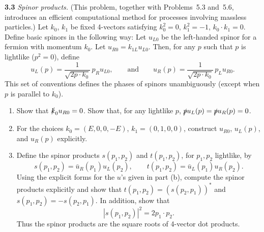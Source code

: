 \textbf{3.3} \emph{Spinor products.}  (This problem, together with
Problems~5.3 and~5.6, introduces an efficient computational method for
processes involving massless particles.)  Let $k_0$, $k_1$ be fixed 4-vectors
satisfying $k_0^2 = 0$, $k_1^2 = -1$, $k_0\cdot k_1 = 0$.  Define basic
spinors in the following way: Let $u_{L0}$ be the left-handed spinor for a
fermion with momentum $k_0$.  Let $u_{R0} = k_{1L}u_{L0}$.  Then, for any
$p$ such that $p$ is lightlike ($p^2 = 0$), define
\begin{equation}
  u_L(p) = \frac{1}{\sqrt{2p\cdot k_0}}\,p_{R}u_{L0},\qquad
  \text{and}\qquad
  u_R(p) = \frac{1}{\sqrt{2p\cdot k_0}}\,p_{L}u_{R0}.
\end{equation}
This set of conventions defines the phases of spinors unambiguously (except
when $p$ is parallel to $k_0$).
\begin{enumerate}[label=(\alph*)]
  \item Show that $\slashed{k}_0 u_{R0} = 0$.  Show that, for any lightlike
    $p$, $\slashed{p}u_L(p) = \slashed{p}u_R(p) = 0$.
  \item For the choices $k_0 = (E, 0, 0, -E)$, $k_1 = (0, 1, 0, 0)$,
    construct $u_{R0}$, $u_L(p)$, and $u_R(p)$ explicitly.
  \item Define the spinor products $s(p_1, p_2)$ and $t(p_1, p_2)$, for
    $p_1, p_2$ lightlike, by
    \begin{equation}
      s(p_1, p_2) = \bar{u}_R(p_1)u_L(p_2),\qquad
      t(p_1, p_2) = \bar{u}_L(p_1)u_R(p_2) .
    \end{equation}
    Using the explicit forms for the $u$'s given in part (b), compute the
    spinor products explicitly and show that
    $t(p_1, p_2) = (s(p_2, p_1))^{*}$ and $s(p_1, p_2) = -s(p_2, p_1)$.
    In addition, show that
    \begin{equation}
      |s(p_1, p_2)|^2 = 2p_1\cdot p_2 .
    \end{equation}
    Thus the spinor products are the square roots of 4-vector dot products.
\end{enumerate}

